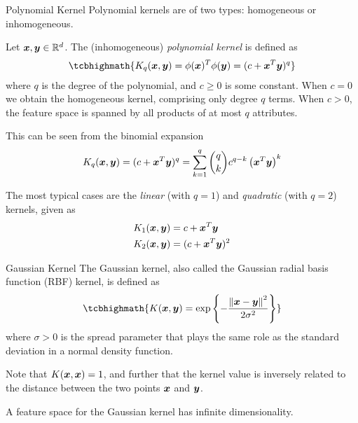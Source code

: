 \begin{frame}{Polynomial Kernel}
  \small
Polynomial kernels are of two types: homogeneous or
inhomogeneous.


\medskip
Let ${\boldsymbol x}, {\boldsymbol y} \in {\mathord{\mathbb R}}^d$.
The (inhomogeneous) {\em polynomial
kernel} is def\/{i}ned as
  \begin{align*}
\tcbhighmath{
    K_q(\bx, \by)= \phi(\bx)^T \phi(\by) =
    (c+\bx^{T}\by)^q
}
  \end{align*}
  where $q$ is the degree of the polynomial, and $c \ge 0$ is some
  constant. When $c=0$ we obtain the homogeneous kernel,
  comprising only degree $q$ terms. When
  $c>0$, the feature space is spanned
  by all products of at most $q$ attributes.
  
  This can be seen
  from the binomial expansion
  \begin{align*}
      K_q({\boldsymbol x}, {\boldsymbol y}) = (c+{\boldsymbol x}^T{\boldsymbol y})^q
      = \sum_{k=1}^q {q \choose k} c^{q-k} \left( {\boldsymbol x}^T{\boldsymbol y} \right)^k
  \end{align*}

\medskip
The most typical cases are the {\em linear} (with $q=1$) and
  {\em quadratic} (with $q=2$) kernels, given as
  \begin{align*}
      K_1({\boldsymbol x}, {\boldsymbol y}) &= c+ {\boldsymbol x}^T{\boldsymbol y}\\
     K_2({\boldsymbol x}, {\boldsymbol y}) &= (c+ {\boldsymbol x}^T{\boldsymbol y})^2
  \end{align*}

\end{frame}


\begin{frame}{Gaussian Kernel}
The Gaussian kernel, also called the Gaussian radial basis
function (RBF) kernel,
is def\/{i}ned as
  \begin{align*}
\tcbhighmath{
      K(\bx, \by) =
    \exp\lB\{-\frac{\norm{\bx-\by}^2}{2\sigma^2} \rB\}
}
  \end{align*}
where $\sigma > 0$ is the spread parameter that plays the same
role as the standard deviation in a normal density function.

\medskip
Note that $K({\boldsymbol x},{\boldsymbol x})=1$, and further that the kernel
value is inversely related to the distance between the two
points ${\boldsymbol x}$ and ${\boldsymbol y}$.

\medskip
A feature space for the Gaussian
kernel has inf\/{i}nite dimensionality. 
\end{frame}

\ifdefined\wox \begin{frame} \titlepage \end{frame} \fi

